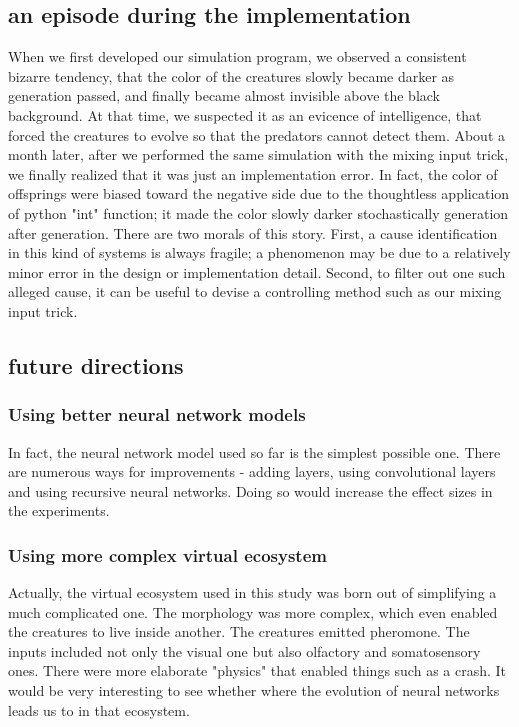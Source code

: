 \documentclass{amsart}
\theoremstyle{definition}
\theoremstyle{remark}
\numberwithin{equation}{section}
\begin{document}
\subsection{an episode during the implementation}
When we first developed our simulation program, we observed a consistent bizarre tendency, that the color of the creatures slowly became darker as generation passed, and finally became almost invisible above the black background. At that time, we suspected it as an evicence of intelligence, that forced the creatures to evolve so that the predators cannot detect them. About a month later, after we performed the same simulation with the mixing input trick, we finally realized that it was just an implementation error. In fact, the color of offsprings were biased toward the negative side due to the thoughtless application of python "int" function; it made the color slowly darker stochastically generation after generation. There are two morals of this story. First, a cause identification in this kind of systems is always fragile; a phenomenon may be due to a relatively minor error in the design or implementation detail. Second, to filter out one such alleged cause, it can be useful to devise a controlling method such as our mixing input trick.   
\subsection{future directions}
\subsubsection{Using better neural network models}
In fact, the neural network model used so far is the simplest possible one. There are numerous ways for improvements - adding layers, using convolutional layers and using recursive neural networks. Doing so would increase the effect sizes in the experiments.

\subsubsection{Using more complex virtual ecosystem}
Actually, the virtual ecosystem used in this study was born out of simplifying a much complicated one. The morphology was more complex, which even enabled the creatures to live inside another. The creatures emitted pheromone. The inputs included not only the visual one but also olfactory and somatosensory ones. There were more elaborate "physics" that enabled things such as a crash. It would be very interesting to see whether where the evolution of neural networks leads us to in that ecosystem. 
\end{document}

